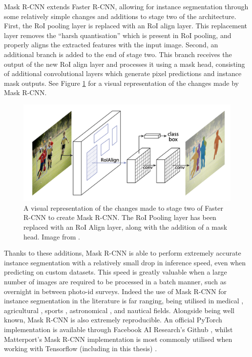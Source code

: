 Mask R-CNN extends Faster R-CNN, allowing for instance segmentation through some relatively simple changes and additions to stage two of the architecture. First, the RoI pooling layer is replaced with an RoI align layer. This replacement layer removes the ``harsh quantisation'' which is present in RoI pooling, and properly aligns the extracted features with the input image. Second, an additional branch is added to the end of stage two. This branch receives the output of the new RoI align layer and processes it using a mask head, consisting of additional convolutional layers which generate pixel predictions and instance mask outputs. See Figure \ref{fig:mask-r-cnn-changes} for a visual representation of the changes made by Mask R-CNN.  

\begin{figure}
	\begin{center}
		\includegraphics[scale=0.5]{Chapter2/figs/mask-r-cnn-changes.png}
	\end{center}
	\caption[A visual representation of the changes made to stage two of Faster R-CNN to create Mask R-CNN.]{A visual representation of the changes made to stage two of Faster R-CNN to create Mask R-CNN. The RoI Pooling layer has been replaced with an RoI Align layer, along with the addition of a mask head. Image from \cite{he_mask_2017}.}
	\label{fig:mask-r-cnn-changes}
\end{figure}

Thanks to these additions, Mask R-CNN is able to perform extremely accurate instance segmentation with a relatively small drop in inference speed, even when predicting on custom datasets. This speed is greatly valuable when a large number of images are required to be processed in a batch manner, such as overnight in between photo-id surveys. Indeed the use of Mask R-CNN for instance segmentation in the literature is far ranging, being utilised in medical \cite{rohit_malhotra_autonomous_2018, chiao_detection_2019, liu_segmentation_2018, anantharaman_utilizing_2018}, agricultural \cite{qiao_cattle_2019, zhao_comparing_2018, lee_potato_2020, chu_deepapple_2020}, sports \cite{buric_ball_2018, pobar_detection_2019, nguyen_hand_2018}, astronomical \cite{burke_deblending_2019}, and nautical \cite{nie_inshore_2018, hong_trashcan_2020} fields. Alongside being well known, Mask R-CNN is also extremely reproducible. An official PyTorch implementation is available through Facebook AI Research's Github \cite{wu_detectron2_2020}, whilst Matterport's Mask R-CNN implementation is most commonly utilised when working with Tensorflow (including in this thesis) \cite{waleed_mask_2017}.

